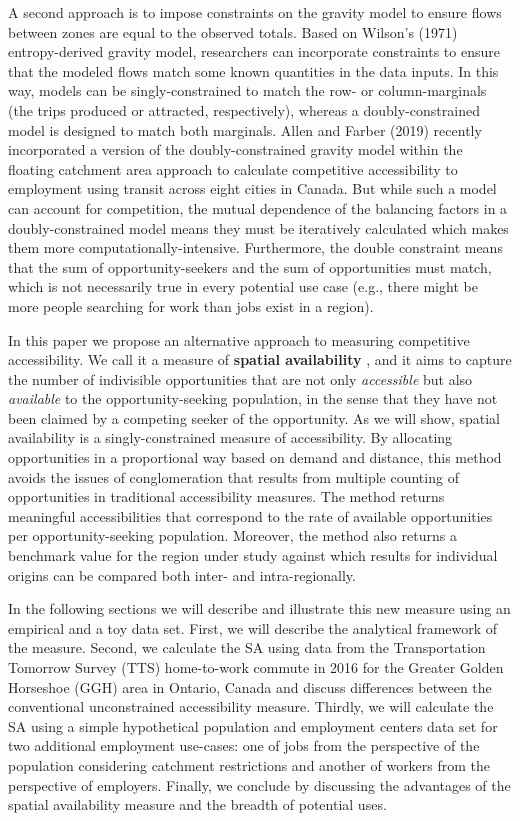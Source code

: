 \documentclass[]{elsarticle} %
\begin{document}
A second approach is to impose constraints on the gravity model to
ensure flows between zones are equal to the observed totals. Based on
Wilson's (1971) entropy-derived gravity model, researchers can
incorporate constraints to ensure that the modeled flows match some
known quantities in the data inputs. In this way, models can be
singly-constrained to match the row- or column-marginals (the trips
produced or attracted, respectively), whereas a doubly-constrained model
is designed to match both marginals. Allen and Farber (2019) recently
incorporated a version of the doubly-constrained gravity model within
the floating catchment area approach to calculate competitive
accessibility to employment using transit across eight cities in Canada.
But while such a model can account for competition, the mutual
dependence of the balancing factors in a doubly-constrained model means
they must be iteratively calculated which makes them more
computationally-intensive. Furthermore, the double constraint means that
the sum of opportunity-seekers and the sum of opportunities must match,
which is not necessarily true in every potential use case (e.g., there
might be more people searching for work than jobs exist in a region).

In this paper we propose an alternative approach to measuring
competitive accessibility. We call it a measure of \textbf{spatial
availability} , and it aims to capture the number of indivisible
opportunities that are not only \emph{accessible} but also
\emph{available} to the opportunity-seeking population, in the sense
that they have not been claimed by a competing seeker of the
opportunity. As we will show, spatial availability is a
singly-constrained measure of accessibility. By allocating opportunities
in a proportional way based on demand and distance, this method avoids
the issues of conglomeration that results from multiple counting of
opportunities in traditional accessibility measures. The method returns
meaningful accessibilities that correspond to the rate of available
opportunities per opportunity-seeking population. Moreover, the method
also returns a benchmark value for the region under study against which
results for individual origins can be compared both inter- and
intra-regionally.

In the following sections we will describe and illustrate this new
measure using an empirical and a toy data set. First, we will describe
the analytical framework of the measure. Second, we calculate the SA
using data from the Transportation Tomorrow Survey (TTS) home-to-work
commute in 2016 for the Greater Golden Horseshoe (GGH) area in Ontario,
Canada and discuss differences between the conventional unconstrained
accessibility measure. Thirdly, we will calculate the SA using a simple
hypothetical population and employment centers data set for two
additional employment use-cases: one of jobs from the perspective of the
population considering catchment restrictions and another of workers
from the perspective of employers. Finally, we conclude by discussing
the advantages of the spatial availability measure and the breadth of
potential uses.
\end{document}
